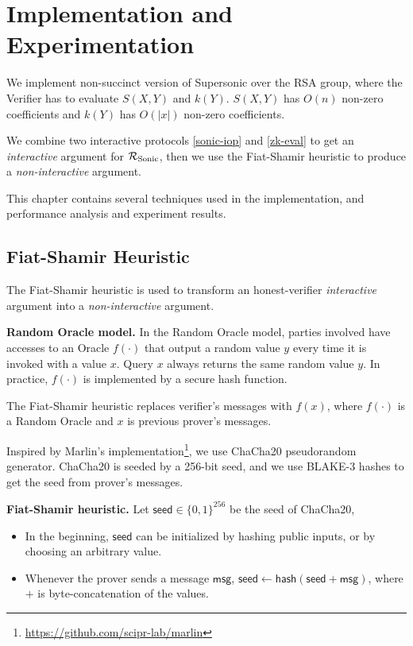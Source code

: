 \chapter{Implementation and Experimentation}
\label{chap-implement}

We implement non-succinct version of Supersonic over the RSA group, where the Verifier has to evaluate $S(X, Y)$ and $k(Y)$. $S(X, Y)$ has $O(n)$ non-zero coefficients and $k(Y)$ has $O(|x|)$ non-zero coefficients.

We combine two interactive protocols \ref{sonic-iop} and \ref{zk-eval} to get an \textit{interactive} argument for $\mathcal{R}_{\mathrm{Sonic}}$, then we use the Fiat-Shamir heuristic to produce a \textit{non-interactive} argument.

This chapter contains several techniques used in the implementation, and performance analysis and experiment results.

\section{Fiat-Shamir Heuristic}
\label{sec-fiat-shamir}

The Fiat-Shamir heuristic is used to transform an honest-verifier \textit{interactive} argument into a \textit{non-interactive} argument.

\textbf{Random Oracle model.} In the Random Oracle model, parties involved have accesses to an Oracle $f(\cdot)$ that output a random value $y$ every time it is invoked with a value $x$. Query $x$ always returns the same random value $y$. In practice, $f(\cdot)$ is implemented by a secure hash function.

The Fiat-Shamir heuristic replaces verifier's messages with $f(x)$, where $f(\cdot)$ is a Random Oracle and $x$ is previous prover's messages.

Inspired by Marlin's implementation\footnote{\url{https://github.com/scipr-lab/marlin}}, we use ChaCha20 pseudorandom generator. ChaCha20 is seeded by a 256-bit seed, and we use BLAKE-3 hashes to get the seed from prover's messages.

\textbf{Fiat-Shamir heuristic.} Let $\mathsf{seed} \in \{0, 1\}^{256}$ be the seed of ChaCha20,
\begin{itemize}
    \item In the beginning, $\mathsf{seed}$ can be initialized by hashing public inputs, or by choosing an arbitrary value.
    \item Whenever the prover sends a message $\mathsf{msg}$, $\mathsf{seed} \gets \mathsf{hash}(\mathsf{seed} + \mathsf{msg})$, where $+$ is byte-concatenation of the values. 
\end{itemize}

